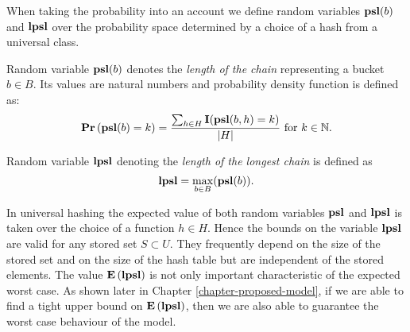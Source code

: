 When taking the probability into an account we define random variables $\mathbf{psl}(b)$ and $\mathbf{lpsl}$ over the probability space determined by a choice of a hash from a universal class.

\begin{definition}
\label{definition-lpsl}
\label{definition-psl}
Random variable $\mathbf{psl}(b)$ denotes the \emph{length of the chain} representing a bucket $b \in B$. Its values are natural numbers and probability density function is defined as:
\[
\mathbf{Pr}\left(\mathbf{psl}(b) = k\right) = \frac{\sum_{h \in H} \mathbf{I}(\mathbf{psl}(b, h) = k)}{|H|} \text{ for } k \in \mathbb{N} \text{.}
\]

Random variable $\mathbf{lpsl}$ denoting the \emph{length of the longest chain} is defined as
\[
\mathbf{lpsl} = \displaystyle\max_{b \in B}(\mathbf{psl}(b))\text{.}
\]
\end{definition}

In universal hashing the expected value of both random variables $\mathbf{psl}$ and $\mathbf{lpsl}$ is taken over the choice of a function $h \in H$. Hence the bounds on the variable $\mathbf{lpsl}$ are valid for any stored set $S \subset U$. They frequently depend on the size of the stored set and on the size of the hash table but are independent of the stored elements. The value $\mathbf{E}\left(\mathbf{lpsl}\right)$ is not only important characteristic of the expected worst case. As shown later in Chapter \ref{chapter-proposed-model}, if we are able to find a tight upper bound on $\mathbf{E}\left(\mathbf{lpsl}\right)$, then we are also able to guarantee the worst case behaviour of the model.

